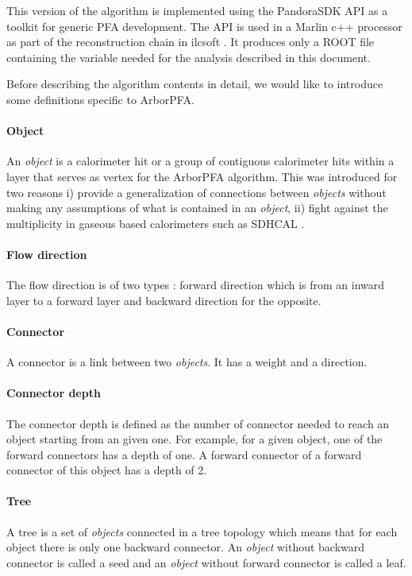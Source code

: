 \documentclass[cits]{JINST}
\begin{document}
This version of the algorithm is implemented using the PandoraSDK API as a toolkit for generic PFA development. The API is used in a Marlin c++ processor as part of the reconstruction chain in ilcsoft \cite{ilcsoft}. It produces only a ROOT \cite{root} file containing the variable needed for the analysis described in this document.

Before describing the algorithm contents in detail, we would like to introduce some definitions specific to ArborPFA.

\paragraph*{Object} An \textit{object} is a calorimeter hit or a group of contiguous calorimeter hits within a layer that serves as vertex for the ArborPFA algorithm. This was introduced for two reasons i) provide a generalization of connections between \textit{objects} without making any assumptions of what is contained in an \textit{object}, ii) fight against the multiplicity in gaseous based calorimeters such as SDHCAL \cite{sdhcal-paper}.

\paragraph*{Flow direction} The flow direction is of two types : forward direction which is from an inward layer to a forward layer and backward direction for the opposite.

\paragraph*{Connector} A connector is a link between two \textit{objects}. It has a weight and a direction.

\paragraph*{Connector depth} The connector depth is defined as the number of connector needed to reach an object starting from an given one. For example, for a given object, one of the forward connectors has a depth of one. A forward connector of a forward connector of this object has a depth of 2.

\paragraph*{Tree} A tree is a set of \textit{objects} connected in a tree topology which means that for each object there is only one backward connector. An \textit{object} without backward connector is called a seed and an \textit{object} without forward connector is called a leaf.
\end{document}
